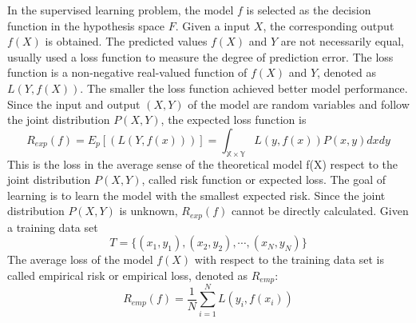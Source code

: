 In the supervised learning problem, the model $f$ is selected as the decision function in the hypothesis space $F$. Given a input $X$, the corresponding output $f(X)$ is obtained. The predicted values $f(X)$ and $Y$ are not necessarily equal, usually used a loss function to measure the degree of prediction error. The loss function is a non-negative real-valued function of $f(X)$ and $Y$, denoted as $L(Y, f(X))$.
The smaller the loss function achieved better model performance. Since the input and output $(X, Y)$ of the model are random variables and follow the joint distribution $P(X, Y)$, the expected loss function is
\begin{equation}
R_{exp}(f)=E_p[(L(Y,f(x)))]=\int_{\mathbb{X}\times \mathbb{Y}} L(y,f(x))P(x,y)dxdy
\end{equation}
This is the loss in the average sense of the theoretical model f(X) respect to the joint distribution $P(X, Y)$, called risk function or expected loss. The goal of learning is to learn the model with the smallest expected risk. Since the joint distribution $P(X, Y)$ is unknown, $R_{exp}(f)$ cannot be directly calculated.
Given a training data set $$T=\{(x_1,y_1),(x_2,y_2),\cdots,(x_N,y_N)\}$$
The average loss of the model $f(X)$ with respect to the training data set is called empirical risk or empirical loss, denoted as $R_{emp}$:
$$R_{emp}(f)=\frac{1}{N}\sum_{i=1}^NL(y_i,f(x_i))$$

